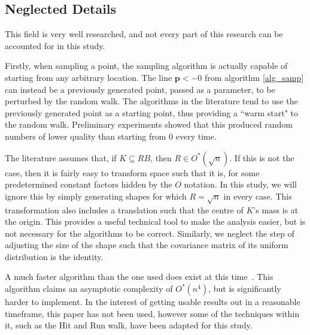 \subsection{Neglected Details}

This field is very well researched, and not every part of this research can be accounted for in this study.

Firstly, when sampling a point, the sampling algorithm is actually capable of starting from any arbitrary location. The line ${\bm p} <- 0$ from algorithm \ref{alg_samp} can instead be a previously generated point, passed as a parameter, to be perturbed by the random walk. The algorithms in the literature tend to use the previously generated point as a starting point, thus providing a ``warm start" to the random walk. Preliminary experiments showed that this produced random numbers of lower quality than starting from $0$ every time.

The literature assumes that, if $K \subseteq RB$, then $R \in O^{*}(\sqrt{n})$. If this is not the case, then it is fairly easy to transform space such that it is, for some predetermined constant factors hidden by the $O$ notation. In this study, we will ignore this by simply generating shapes for which $R = \sqrt{n}$ in every case. This transformation also includes a translation such that the centre of $K$'s mass is at the origin. This provides a useful technical tool to make the analysis easier, but is not necessary for the algorithms to be correct. Similarly, we neglect the step of adjusting the size of the shape such that the covariance matrix of its uniform distribution is the identity.

A much faster algorithm than the one used does exist at this time~\cite{Lovasz03}. This algorithm claims an asymptotic complexity of $O^{*}(n^4)$, but is significantly harder to implement. In the interest of getting usable results out in a reasonable timeframe, this paper has not been used, however some of the techniques within it, such as the Hit and Run walk, have been adapted for this study.